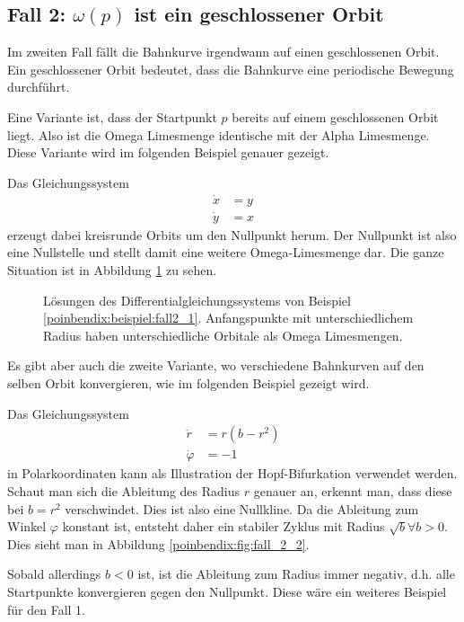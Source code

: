 \subsection{Fall 2: $\omega(p)$ ist ein geschlossener Orbit} \label{poinbendix:subsection:fall2}

Im zweiten Fall fällt die Bahnkurve irgendwann auf einen geschlossenen Orbit.
Ein geschlossener Orbit bedeutet, dass die Bahnkurve eine periodische Bewegung durchführt.

Eine Variante ist, dass der Startpunkt $p$ bereits auf einem geschlossenen Orbit liegt.
Also ist die Omega Limesmenge identische mit der Alpha Limesmenge.
Diese Variante wird im folgenden Beispiel genauer gezeigt.


\begin{beispiel} \label{poinbendix:beispiel:fall2_1}
Das Gleichungssystem
\begin{align*}
    \dot{x} &= y \\
    \dot{y} &= x
\end{align*}
erzeugt dabei kreisrunde Orbits um den Nullpunkt herum.
Der Nullpunkt ist also eine Nullstelle und stellt damit eine weitere Omega-Limesmenge dar.
Die ganze Situation ist in Abbildung \ref{poinbendix:fig:fall_2} zu sehen.
\end{beispiel}

\begin{figure}
\centering
    
    \caption{Lösungen des Differentialgleichungssystems von Beispiel \ref{poinbendix:beispiel:fall2_1}.
    Anfangspunkte mit unterschiedlichem Radius haben unterschiedliche Orbitale als Omega Limesmengen.}
\label{poinbendix:fig:fall_2}
\end{figure}

Es gibt aber auch die zweite Variante, wo verschiedene Bahnkurven auf den selben Orbit konvergieren, wie im folgenden Beispiel gezeigt wird.

\begin{beispiel} \label{poinbendix:beispiel:fall2_2}
Das Gleichungssystem
\begin{align*}
    \dot{r}       &= r(b-r^2) \\
    \dot{\varphi} &= -1
\end{align*}
in Polarkoordinaten kann als Illustration der Hopf-Bifurkation verwendet werden.
Schaut man sich die Ableitung des Radius $r$ genauer an, erkennt man, dass diese bei $b = r^2$ verschwindet.
Dies ist also eine Nullkline.
Da die Ableitung zum Winkel $\varphi$ konstant ist, entsteht daher ein stabiler Zyklus mit Radius $\sqrt{b} \forall b > 0$.
Dies sieht man in Abbildung \ref{poinbendix:fig:fall_2_2}.

Sobald allerdings $b < 0$ ist, ist die Ableitung zum Radius immer negativ, d.h. alle Startpunkte konvergieren gegen den Nullpunkt.
Diese wäre ein weiteres Beispiel für den Fall 1.
\end{beispiel}

